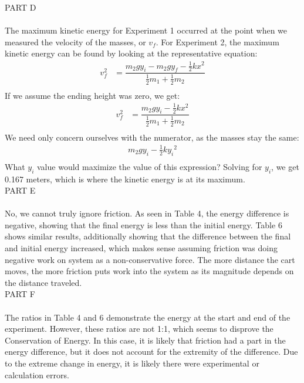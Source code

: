 \documentclass [12pt, letterpaper, twoside] {article}
\begin{document}
\noindent
PART D \\\\
The maximum kinetic energy for Experiment 1 occurred at the point when we measured the velocity of the masses, or \(v_{f}\). For Experiment 2, the maximum kinetic energy can be found by looking at the representative equation: 
\begin {equation*}
  \begin {split}
    v_{f}^2 & = \dfrac{m_{2}gy_{i} - m_{2}gy_{f} - \tfrac{1}{2}kx^2}{\tfrac{1}{2}m_{1}+\tfrac{1}{2}m_{2}} \\
  \end {split}
\end {equation*}
If we assume the ending height was zero, we get:
\begin {equation*}
  \begin {split}
    v_{f}^2 & = \dfrac{m_{2}gy_{i} - \tfrac{1}{2}kx^2}{\tfrac{1}{2}m_{1}+\tfrac{1}{2}m_{2}} \\
  \end {split}
\end {equation*}
We need only concern ourselves with the numerator, as the masses stay the same:
\begin {equation*}
  \begin {split}
    m_{2}gy_{i} - \tfrac{1}{2}k{y_{i}}^2 \\
  \end {split}
\end {equation*}
What \(y_{i}\) value would maximize the value of this expression? Solving for \(y_{i}\), we get 0.167 meters, which is where the kinetic energy is at its maximum. \\

\noindent
PART E \\\\
No, we cannot truly ignore friction. As seen in Table 4, the energy difference is negative, showing that the final energy is less than the initial energy. Table 6 shows similar results, additionally showing that the difference between the final and initial energy increased, which makes sense assuming friction was doing negative work on system as a non-conservative force. The more distance the cart moves, the more friction puts work into the system as its magnitude depends on the distance traveled. \\

\noindent
PART F \\\\
The ratios in Table 4 and 6 demonstrate the energy at the start and end of the experiment. However, these ratios are not 1:1, which seems to disprove the Conservation of Energy. In this case, it is likely that friction had a part in the energy difference, but it does not account for the extremity of the difference. Due to the extreme change in energy, it is likely there were experimental or calculation errors. \\
\end{document}

